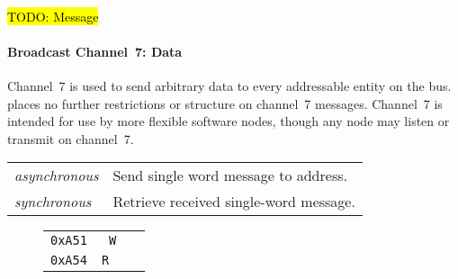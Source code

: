 ~

\hl{TODO: Message}



\paragraph{Broadcast Channel~7: Data}
\label{scratch:scratch:sec:channel-7}
Channel~7 is used to send arbitrary data to every addressable entity on the
bus. \bus places no further restrictions or structure on channel~7 messages.
Channel~7 is intended for use by more flexible software nodes, though any node
may listen or transmit on channel~7.


\begin{tabular}{l l}
  {\em asynchronous} & Send single word message to address. \\
  {\em  synchronous} & Retrieve received single-word message. \\
\end{tabular}

\begin{figure}[!h]
\begin{tabular}{ c|c|l }
  {\tt 0xA51} & \tt ~W & \nameref{reg-tx-single} \\
  {\tt 0xA54} & \tt R~ & \nameref{reg-rx-single} \\
\end{tabular}
\end{figure}

